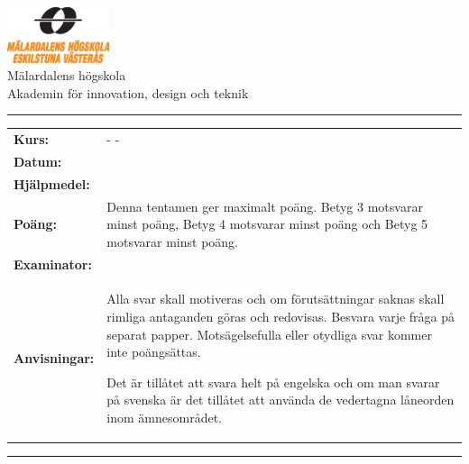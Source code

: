 \begin{center}\includegraphics[width=3cm]{logo.eps}\\
	\Large Mälardalens högskola\\
	\large Akademin för innovation, design och teknik
\end{center}
\hrule{}\textit{ }\newline\newline
\newlength{\padding}
\setlength{\padding}{2.5mm}
\begin{tabular}{lp{9cm}}
	\textbf{Kurs:}&\CourseCode{} - \CourseName{} - \CoursePoints{} \vspace{\padding}\\
	\textbf{Datum:}&\Date\vspace{\padding}\\
	\textbf{Hjälpmedel:}&\AllowedResources\vspace{\padding}\\
	\textbf{Poäng:}&Denna tentamen ger maximalt \theTotalPoints{} poäng. Betyg 3 motsvarar minst \GradeThree{} poäng, Betyg 4 motsvarar minst \GradeFour{} poäng och Betyg 5 motsvarar minst \GradeFive{} poäng.\vspace{\padding}\\
	\textbf{Examinator:}&\Examinator\vspace{\padding}\\
	\textbf{Anvisningar:}&Alla svar skall motiveras och om förutsättningar saknas skall rimliga antaganden göras och redovisas. Besvara varje fråga på separat papper. Motsägelsefulla eller otydliga svar kommer inte poängsättas.\par{}Det är tillåtet att svara helt på engelska och om man svarar på svenska är det tillåtet att använda de vedertagna låneorden inom ämnesområdet.\vspace{\padding}
\end{tabular}
\hrule{}\textit{ }\newline

\setcounter{TotalPoints}{0}